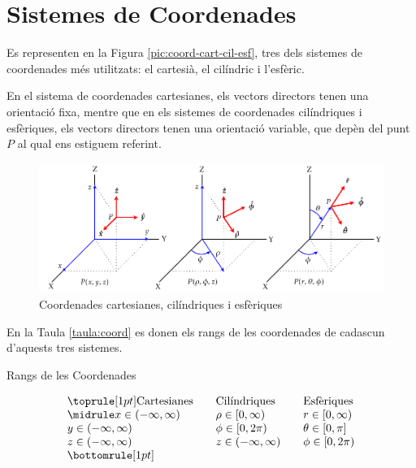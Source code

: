 \documentclass[catalan,a4paper,twoside,11pt]{article}
\begin{document}
\newcommand{\va}{\ensuremath{\,\boldsymbol{\hat{x}}}}
\newcommand{\vb}{\ensuremath{\,\boldsymbol{\hat{y}}}}
\newcommand{\vc}{\ensuremath{\,\boldsymbol{\hat{z}}}}
\section{Sistemes de Coordenades}

Es representen en la Figura \vref{pic:coord-cart-cil-esf}, tres dels
sistemes de coordenades més utilitzats: el cartesià, el
cilíndric i l'esfèric.

En el sistema de coordenades cartesianes, els vectors directors
tenen una orientació fixa, mentre que en els sistemes de
coordenades cilíndriques i esfèriques, els vectors
directors tenen una orientació variable, que depèn del punt
$P$ al qual ens estiguem referint.


\begin{figure}[h]
\centering
   \includegraphics{Imatges/Coordenades.pdf}
\caption{Coordenades cartesianes, cilíndriques i esfèriques}
\label{pic:coord-cart-cil-esf}
\end{figure}

\pagebreak
En la Taula \vref{taula:coord} es donen els rangs de les coordenades de cadascun d'aquests tres sistemes.
\begin{table}[htb]
   \caption{\label{taula:coord}Rangs de les Coordenades}
   \[ \begin{array}{lllll}
   \toprule[1pt]
   \text{Cartesianes} &  & \text{Cilíndriques} & & \text{Esfèriques}
   \\
   \midrule
      x\in(-\infty,\infty) &   & \rho\in[0,\infty)    &  &  r\in[0,\infty)  \\
      y\in(-\infty,\infty) &   & \phi\in[0,2\pi)   &  &  \theta\in[0,\pi] \\
      z\in(-\infty,\infty) &   & z\in(-\infty,\infty) &  &  \phi\in[0,2\pi) \\
   \bottomrule[1pt]
   \end{array}   \]
\end{table}
\end{document}
